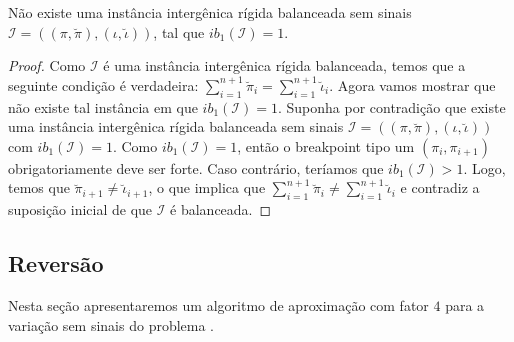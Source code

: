 \begin{lemma}\label{lemma:WSPRPLAH}
Não existe uma instância intergênica rígida balanceada sem sinais $\mathcal{I}=((\pi,\breve\pi),(\iota,\breve\iota))$, tal que $ib_1(\mathcal{I}) = 1$.
\end{lemma}
\begin{proof}
Como $\mathcal{I}$ é uma instância intergênica rígida balanceada, temos que a seguinte condição é verdadeira: $\sum_{i=1}^{n+1}\breve\pi_i = \sum_{i=1}^{n+1}\breve\iota_i$. Agora vamos mostrar que não existe tal instância em que $ib_1(\mathcal{I}) = 1$. Suponha por contradição que existe uma instância intergênica rígida balanceada sem sinais $\mathcal{I}=((\pi,\breve\pi),(\iota,\breve\iota))$ com $ib_1(\mathcal{I}) = 1$. Como $ib_1(\mathcal{I}) = 1$, então o breakpoint tipo um $(\pi_i,\pi_{i+1})$ obrigatoriamente deve ser forte. Caso contrário, teríamos que $ib_1(\mathcal{I}) > 1$. Logo, temos que $\breve\pi_{i+1} \ne \breve\iota_{i+1}$, o que implica que $\sum_{i=1}^{n+1}\breve\pi_i \ne \sum_{i=1}^{n+1}\breve\iota_i$ e contradiz a suposição inicial de que $\mathcal{I}$ é balanceada.
\end{proof}


\subsection{Reversão}

Nesta seção apresentaremos um algoritmo de aproximação com fator $4$ para a variação sem sinais do problema \SbIR{}.

